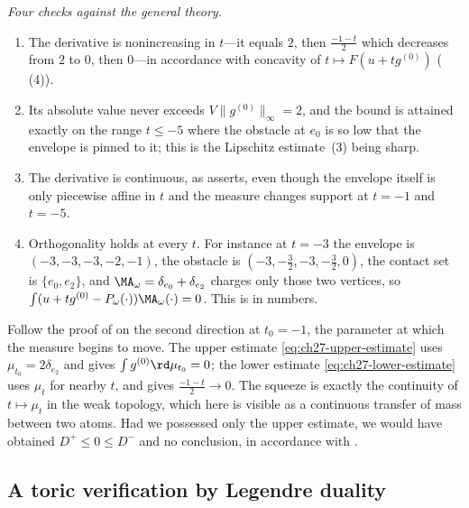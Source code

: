 \begin{example}
\emph{Four checks against the general theory.}
\begin{enumerate}
\item The derivative is nonincreasing in \(t\)---it equals \(2\), then
\(\tfrac{-1-t}2\) which decreases from \(2\) to \(0\), then \(0\)---in
accordance with concavity of \(t\mapsto F(u+tg^{(0)})\)
(\,(4)).
\item Its absolute value never exceeds
\(V\lVert g^{(0)}\rVert_\infty=2\), and the bound is attained exactly on the
range \(t\leq-5\) where the obstacle at \(e_0\) is so low that the envelope
is pinned to it; this is the Lipschitz estimate
\,(3) being sharp.
\item The derivative is continuous, as
 asserts, even though the
envelope itself is only piecewise affine in \(t\) and the measure changes
support at \(t=-1\) and \(t=-5\).
\item Orthogonality holds at every \(t\).  For instance at \(t=-3\) the
envelope is \((-3,-3,-3,-2,-1)\), the obstacle is
\((-3,-\tfrac32,-3,-\tfrac32,0)\), the contact set is \(\{e_0,e_2\}\), and
\(\MA_\omega=\delta_{e_0}+\delta_{e_2}\) charges only those two vertices,
so \(\int(u+tg^{(0)}-P_\omega(\cdot))\MA_\omega(\cdot)=0\).  This is
 in numbers.
\end{enumerate}
\end{example}

\begin{remark}
\label{rem:ch27-curve-example-lesson}
Follow the proof of
 on the second direction at
\(t_0=-1\), the parameter at which the measure begins to move.  The upper
estimate \eqref{eq:ch27-upper-estimate} uses \(\mu_{t_0}=2\delta_{e_2}\) and
gives \(\int g^{(0)}\rd\mu_{t_0}=0\); the lower estimate
\eqref{eq:ch27-lower-estimate} uses \(\mu_t\) for nearby \(t\), and gives
\(\tfrac{-1-t}2\to0\).  The squeeze is exactly the continuity of
\(t\mapsto\mu_t\) in the weak topology, which here is visible as a
continuous transfer of mass between two atoms.  Had we possessed only the
upper estimate, we would have obtained \(D^+\leq0\leq D^-\) and no
conclusion, in accordance with
.
\end{remark}

\subsection{A toric verification by Legendre duality}
\label{sec:ch27-toric-numbers}

